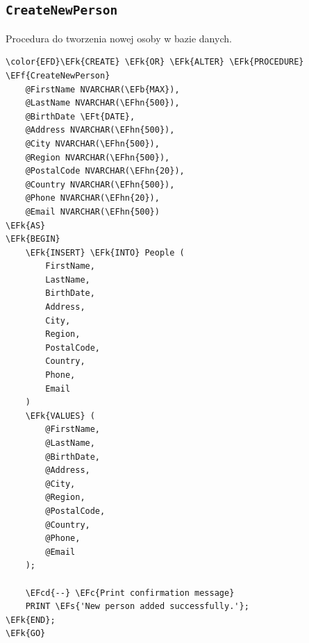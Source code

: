 \documentclass[11pt]{article}
\newcommand{\EFc}[1]{\textcolor{EFc}{\textit{#1}}} %
\newcommand{\EFcd}[1]{\textcolor{EFcd}{\textit{#1}}} %
\newcommand{\EFs}[1]{\textcolor{EFs}{#1}} %
\newcommand{\EFk}[1]{\textcolor{EFk}{\textbf{#1}}} %
\newcommand{\EFb}[1]{\textcolor{EFb}{\textbf{#1}}} %
\newcommand{\EFf}[1]{\textcolor{EFf}{#1}} %
\newcommand{\EFt}[1]{\textcolor{EFt}{\textbf{#1}}} %
\newcommand{\EFhn}[1]{\textcolor{EFhn}{#1}} %
\begin{document}
\subsection{\texttt{CreateNewPerson}}
\label{sec:org3c72d92}
Procedura do tworzenia nowej osoby w bazie danych.
\begin{Code}
\begin{Verbatim}
\color{EFD}\EFk{CREATE} \EFk{OR} \EFk{ALTER} \EFk{PROCEDURE} \EFf{CreateNewPerson}
    @FirstName NVARCHAR(\EFb{MAX}),
    @LastName NVARCHAR(\EFhn{500}),
    @BirthDate \EFt{DATE},
    @Address NVARCHAR(\EFhn{500}),
    @City NVARCHAR(\EFhn{500}),
    @Region NVARCHAR(\EFhn{500}),
    @PostalCode NVARCHAR(\EFhn{20}),
    @Country NVARCHAR(\EFhn{500}),
    @Phone NVARCHAR(\EFhn{20}),
    @Email NVARCHAR(\EFhn{500})
\EFk{AS}
\EFk{BEGIN}
    \EFk{INSERT} \EFk{INTO} People (
        FirstName,
        LastName,
        BirthDate,
        Address,
        City,
        Region,
        PostalCode,
        Country,
        Phone,
        Email
    )
    \EFk{VALUES} (
        @FirstName,
        @LastName,
        @BirthDate,
        @Address,
        @City,
        @Region,
        @PostalCode,
        @Country,
        @Phone,
        @Email
    );

    \EFcd{--} \EFc{Print confirmation message}
    PRINT \EFs{'New person added successfully.'};
\EFk{END};
\EFk{GO}
\end{Verbatim}
\end{Code}
\end{document}
